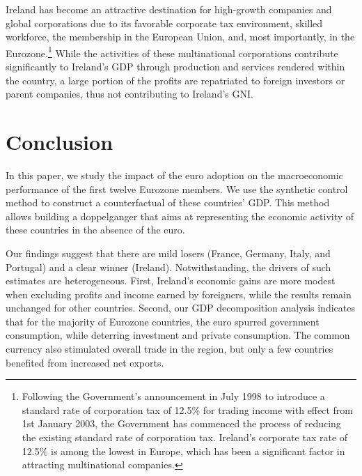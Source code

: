 \documentclass[12pt]{article}
\begin{document}
Ireland has become an attractive destination for high-growth companies and global corporations due to its favorable corporate tax environment, skilled workforce, the membership in the European Union, and, most importantly, in the Eurozone.\footnote{Following the Government's announcement in July 1998 to introduce a standard rate of corporation tax of 12.5\% for trading income with effect from 1st January 2003, the Government has commenced the process of reducing the existing standard rate of corporation tax. Ireland's corporate tax rate of 12.5\% is among the lowest in Europe, which has been a significant factor in attracting multinational companies.} While the activities of these multinational corporations contribute significantly to Ireland's GDP through production and services rendered within the country, a large portion of the profits are repatriated to foreign investors or parent companies, thus not contributing to Ireland's GNI.

\section{Conclusion \label{S_Conclusion}}
In this paper, we study the impact of the euro adoption on the macroeconomic performance of the first twelve Eurozone members. We use the synthetic control method to construct a counterfactual of these countries' GDP. This method allows building a doppelganger that aims at representing the economic activity of these countries in the absence of the euro. 

Our findings suggest that there are mild losers (France, Germany, Italy, and Portugal) and a clear winner (Ireland). Notwithstanding, the drivers of such estimates are heterogeneous. First, Ireland's economic gains are more modest when excluding profits and income earned by foreigners, while the results remain unchanged for other countries. Second, our GDP decomposition analysis indicates that for the majority of Eurozone countries, the euro spurred government consumption, while deterring investment and private consumption. The common currency also stimulated overall trade in the region, but only a few countries benefited from increased net exports.

\end{document}
